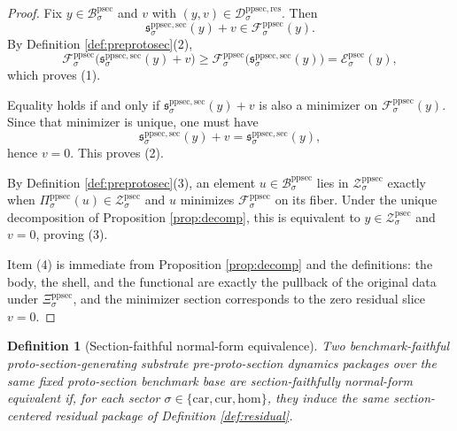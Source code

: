 \documentclass[11pt]{article}
\newcommand{\Car}{\mathrm{car}}
\newcommand{\Cur}{\mathrm{cur}}
\newcommand{\Hom}{\mathrm{hom}}
\newcommand{\ProtoSectionBody}[1]{\mathcal B_{#1}^{\mathrm{psec}}}
\newcommand{\ProtoSectionFunctional}[1]{\mathscr E_{#1}^{\mathrm{psec}}}
\newcommand{\ProtoSectionShell}[1]{\mathcal Z_{#1}^{\mathrm{psec}}}
\newcommand{\PreProtoSectionBody}[1]{\mathcal B_{#1}^{\mathrm{ppsec}}}
\newcommand{\PreProtoSectionProj}[1]{\Pi_{#1}^{\mathrm{ppsec}}}
\newcommand{\PreProtoSectionFiber}[2]{\mathcal F_{#1}^{\mathrm{ppsec}}(#2)}
\newcommand{\PreProtoSectionFunctional}[1]{\mathscr F_{#1}^{\mathrm{ppsec}}}
\newcommand{\PreProtoSectionShell}[1]{\mathcal Z_{#1}^{\mathrm{ppsec}}}
\newcommand{\PreProtoSectionMinSection}[1]{\mathfrak s_{#1}^{\mathrm{ppsec,sec}}}
\newcommand{\PreProtoSectionResidualBody}[1]{\mathcal D_{#1}^{\mathrm{ppsec,res}}}
\newcommand{\PreProtoSectionNormalizer}[1]{\Xi_{#1}^{\mathrm{ppsec}}}
\newtheorem{definition}{Definition}
\begin{document}
\begin{proof}
Fix \(y\in\ProtoSectionBody{\sigma}\) and \(v\) with \((y,v)\in\PreProtoSectionResidualBody{\sigma}\). Then
\[
\PreProtoSectionMinSection{\sigma}(y)+v\in\PreProtoSectionFiber{\sigma}{y}.
\]
By Definition \ref{def:preprotosec}(2),
\[
\PreProtoSectionFunctional{\sigma}\bigl(\PreProtoSectionMinSection{\sigma}(y)+v\bigr)
\ge
\PreProtoSectionFunctional{\sigma}\bigl(\PreProtoSectionMinSection{\sigma}(y)\bigr)
=
\ProtoSectionFunctional{\sigma}(y),
\]
which proves (1).

Equality holds if and only if \(\PreProtoSectionMinSection{\sigma}(y)+v\) is also a minimizer on \(\PreProtoSectionFiber{\sigma}{y}\). Since that minimizer is unique, one must have
\[
\PreProtoSectionMinSection{\sigma}(y)+v=\PreProtoSectionMinSection{\sigma}(y),
\]
hence \(v=0\). This proves (2).

By Definition \ref{def:preprotosec}(3), an element \(u\in\PreProtoSectionBody{\sigma}\) lies in \(\PreProtoSectionShell{\sigma}\) exactly when \(\PreProtoSectionProj{\sigma}(u)\in\ProtoSectionShell{\sigma}\) and \(u\) minimizes \(\PreProtoSectionFunctional{\sigma}\) on its fiber. Under the unique decomposition of Proposition \ref{prop:decomp}, this is equivalent to \(y\in\ProtoSectionShell{\sigma}\) and \(v=0\), proving (3).

Item (4) is immediate from Proposition \ref{prop:decomp} and the definitions: the body, the shell, and the functional are exactly the pullback of the original data under \(\PreProtoSectionNormalizer{\sigma}\), and the minimizer section corresponds to the zero residual slice \(v=0\).
\end{proof}

\begin{definition}[Section-faithful normal-form equivalence]
\label{def:equiv}
Two benchmark-faithful proto-section-generating substrate pre-proto-section dynamics packages over the same fixed proto-section benchmark base are \emph{section-faithfully normal-form equivalent} if, for each sector \(\sigma\in\{\Car,\Cur,\Hom\}\), they induce the same section-centered residual package of Definition \ref{def:residual}.
\end{definition}
\end{document}
